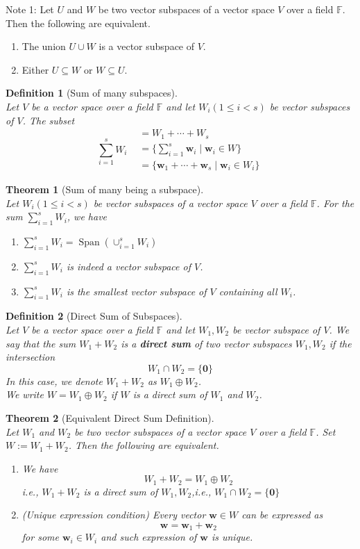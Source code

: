 \documentclass[12pt]{article}
\newtheorem{definition}{Definition}[section]
\newtheorem{theorem}{Theorem}[section]
\theoremstyle{definition}
\DeclareMathOperator{\spn}{Span}
\begin{document}
Note 1: Let $U$ and $W$ be two vector subspaces of a vector space $V$ over a field $\mathbb{F}$. Then the following are equivalent.
\begin{enumerate}
\item The union $U\cup W$ is a vector subspace of $V$.
\item Either $U\subseteq W$ or $W\subseteq U$.
\end{enumerate}
\begin{definition}[Sum of many subspaces]
\hfill\\
\normalfont Let $V$ be a vector space over a field $\mathbb{F}$ and let $W_i(1\leq i<s)$ be vector subspaces of $V$. The subset
\[
\sum_{i=1}^sW_i\begin{aligned}
&=W_1+\cdots+W_s\\
&=\{\sum_{i=1}^s\mathbf{w}_i\mid \mathbf{w}_i\in W\}\\
&=\{\mathbf{w}_1+\cdots+\mathbf{w}_s\mid \mathbf{w}_i\in W_i\}
\end{aligned}
\]
\end{definition}
\begin{theorem}[Sum of many being a subspace]
\hfill\\
\normalfont Let $W_i (1\leq i<s)$ be vector subspaces of a vector space $V$ over a field $\mathbb{F}$. For the sum $\sum_{i=1}^{s}W_i$, we have
\begin{enumerate}
\item $\sum_{i=1}^{s}W_i = \spn(\cup_{i=1}^sW_i)$
\item $\sum_{i=1}^{s}W_i$ is indeed a vector subspace of $V$.
\item $\sum_{i=1}^{s}W_i$ is the smallest vector subspace of $V$ containing all $W_i$.
\end{enumerate}
\end{theorem}
\begin{definition}[Direct Sum of Subspaces]
\hfill\\
\normalfont Let $V$ be a vector space over a field $\mathbb{F}$ and let $W_1, W_2$ be vector subspace of $V$. We say that the sum $W_1+W_2$ is a \textbf{direct sum} of two vector subspaces $W_1, W_2$ if the intersection
\[
W_1\cap W_2=\{\mathbf{0}\}
\]
In this case, we denote $W_1+W_2$ as $W_1\oplus W_2$.\\
We write $W = W_1\oplus W_2$ if $W$ is a direct sum of $W_1$ and $W_2$.
\end{definition}
\begin{theorem}[Equivalent Direct Sum Definition]
\hfill\\
\normalfont Let $W_1$ and $W_2$ be two vector subspaces of a vector space $V$ over a field $\mathbb{F}$. Set $W:=W_1+W_2$. Then the following are equivalent.
\begin{enumerate}
\item We have
\[
W_1+W_2=W_1\oplus W_2
\]
i.e., $W_1+W_2$ is a direct sum of $W_1,W_2$,i.e., $W_1\cap W_2=\{\mathbf{0}\}$
\item (Unique expression condition) Every vector $\mathbf{w}\in W$ can be expressed as
\[
\mathbf{w}=\mathbf{w}_1+\mathbf{w}_2
\]
for some $\mathbf{w}_i\in W_i$ and such expression of $\mathbf{w}$ is unique.
\end{enumerate}
\end{theorem}
\end{document}

